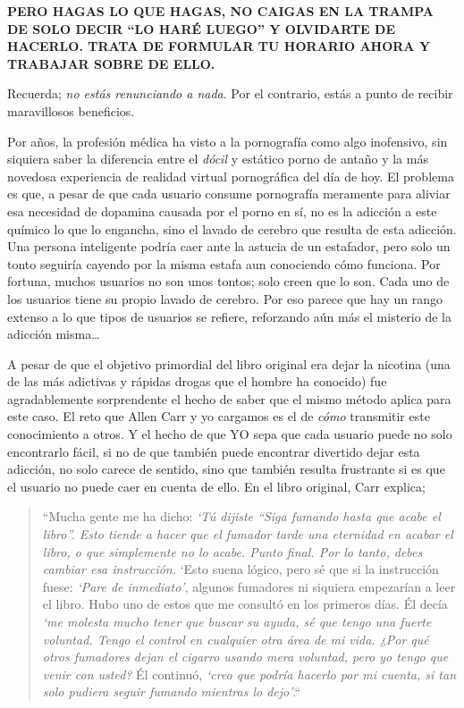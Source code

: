 \documentclass[
  spanish,
  openany]{book}
\begin{document}
\textbf{PERO HAGAS LO QUE HAGAS, NO CAIGAS EN LA TRAMPA DE SOLO DECIR ``LO HARÉ LUEGO'' Y OLVIDARTE DE HACERLO. TRATA DE FORMULAR TU HORARIO {AHORA} Y TRABAJAR SOBRE DE ELLO.}

Recuerda; \emph{no estás renunciando a nada}. Por el contrario, estás a punto de recibir maravillosos beneficios.

Por años, la profesión médica ha visto a la pornografía como algo inofensivo, sin siquiera saber la diferencia entre el \emph{dócil} y estático porno de antaño y la más novedosa experiencia de realidad virtual pornográfica del día de hoy. El problema es que, a pesar de que cada usuario consume pornografía meramente para aliviar esa necesidad de dopamina causada por el porno en sí, no es la adicción a este químico lo que lo engancha, sino el lavado de cerebro que resulta de esta adicción. Una persona inteligente podría caer ante la astucia de un estafador, pero solo un tonto seguiría cayendo por la misma estafa aun conociendo cómo funciona. Por fortuna, muchos usuarios no son unos tontos; solo creen que lo son. Cada uno de los usuarios tiene su propio lavado de cerebro. Por eso parece que hay un rango extenso a lo que tipos de usuarios se refiere, reforzando aún más el misterio de la adicción misma\ldots{}

A pesar de que el objetivo primordial del libro original era dejar la nicotina (una de las más adictivas y rápidas drogas que el hombre ha conocido) fue agradablemente sorprendente el hecho de saber que el mismo método aplica para este caso. El reto que Allen Carr y yo cargamos es el de \emph{cómo} transmitir este conocimiento a otros. Y el hecho de que YO sepa que cada usuario puede no solo encontrarlo fácil, si no de que también puede encontrar divertido dejar esta adicción, no solo carece de sentido, sino que también resulta frustrante si es que el usuario no puede caer en cuenta de ello. En el libro original, Carr explica;

\begin{quote}
``Mucha gente me ha dicho: \emph{`Tú dijiste ``Siga fumando hasta que acabe el libro''. Esto tiende a hacer que el fumador tarde una eternidad en acabar el libro, o que simplemente no lo acabe. Punto final. Por lo tanto, debes cambiar esa instrucción.} `Esto suena lógico, pero sé que si la instrucción fuese: \emph{`Pare de inmediato'}, algunos fumadores ni siquiera empezarían a leer el libro. Hubo uno de estos que me consultó en los primeros días. Él decía \emph{`me molesta mucho tener que buscar su ayuda, sé que tengo una fuerte voluntad. Tengo el control en cualquier otra área de mi vida. ¿Por qué otros fumadores dejan el cigarro usando mera voluntad, pero yo tengo que venir con usted?} Él continuó, \emph{`creo que podría hacerlo por mi cuenta, si tan solo pudiera seguir fumando mientras lo dejo'}.``
\end{quote}
\end{document}
